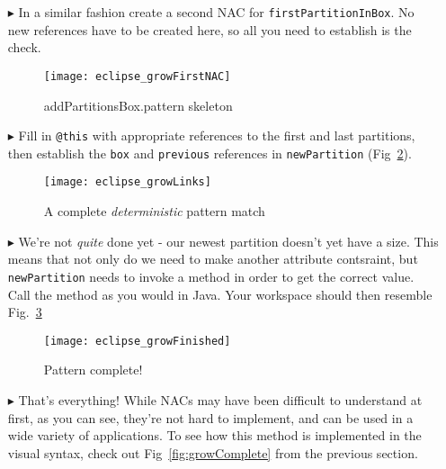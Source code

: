 \begin{itemize}
\vspace{0.5cm}

\item[$\blacktriangleright$] In a similar fashion create a second NAC for \texttt{firstPartitionInBox}. No new references have to be created here, so all you
need to establish is the check.

\begin{figure}[htp]
\begin{center}
  \texttt{[image: eclipse\_growFirstNAC]}
  \caption{addPartitionsBox.pattern skeleton}
  \label{fig:growPattSkel}
\end{center}
\end{figure}

\clearpage

\item[$\blacktriangleright$] Fill in \texttt{@this} with appropriate references to the first and last partitions, then establish the \texttt{box} and
\texttt{previous} references in \texttt{newPartition} (Fig~\ref{fig:growAllLinks}).

\vspace{0.5cm}

\begin{figure}[htp]
\begin{center}
  \texttt{[image: eclipse\_growLinks]}
  \caption{A complete \emph{deterministic} pattern match}
  \label{fig:growAllLinks}
\end{center}
\end{figure}

\item[$\blacktriangleright$] We're not \emph{quite} done yet - our newest partition doesn't yet have a size. This means that not only do we need to make
another attribute contsraint, but \texttt{newPartition} needs to invoke a method in order to get the correct value. Call the method as you would in Java. 
Your workspace should then resemble Fig.~\ref{fig:patternComplete}

\begin{figure}[htp]
\begin{center}
  \texttt{[image: eclipse\_growFinished]}
  \caption{Pattern complete!}
  \label{fig:patternComplete}
\end{center}
\end{figure}

\vspace{0.5cm}

\item[$\blacktriangleright$] That's everything! While NACs may have been difficult to understand at first, as you can see, they're not hard to implement, and
can be used in a wide variety of applications. To see how this method is implemented in the visual syntax, check out Fig~\ref{fig:growComplete} from the previous
section.

\end{itemize}